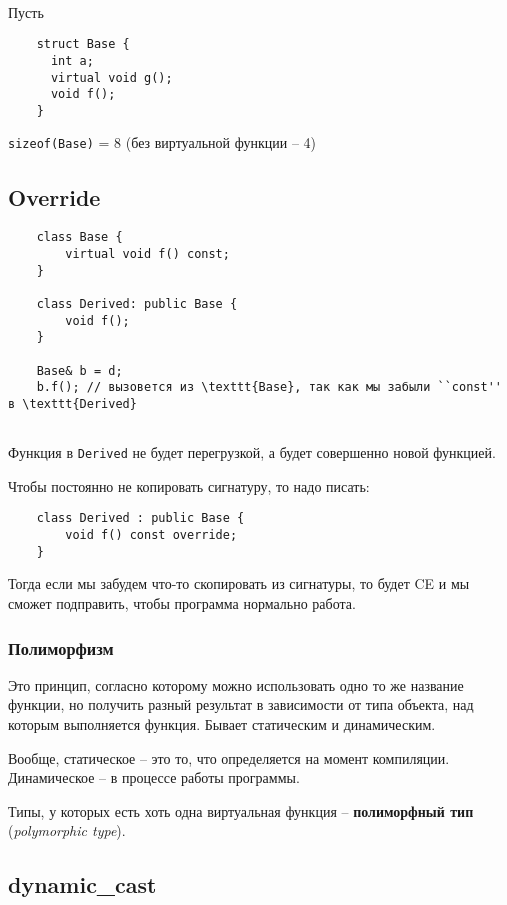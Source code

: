 \documentclass[12pt]{article}
\begin{document}
\

Пусть

\begin{lstlisting}
	struct Base {
	  int a;
	  virtual void g();
	  void f();
	}
\end{lstlisting}

\texttt{sizeof(Base)} = 8 (без виртуальной функции -- 4)

\subsection{Override}

\begin{lstlisting}
	class Base {
		virtual void f() const;
	}
	
	class Derived: public Base {
		void f();
	}
	
	Base& b = d;
	b.f(); // вызовется из \texttt{Base}, так как мы забыли ``const'' в \texttt{Derived}
	
\end{lstlisting}

Функция в \texttt{Derived} не будет перегрузкой, а будет совершенно новой функцией. 

Чтобы постоянно не копировать сигнатуру, то надо писать:

\begin{lstlisting}
	class Derived : public Base {
		void f() const override;
	}
\end{lstlisting}

Тогда если мы забудем что-то скопировать из сигнатуры, то будет CE и мы сможет подправить, чтобы программа нормально работа. 

\subsubsection{Полиморфизм}

Это принцип, согласно которому можно использовать одно то же название функции, но получить разный результат в зависимости от типа объекта, над которым выполняется функция. Бывает статическим и динамическим. 

Вообще, статическое -- это то, что определяется на момент компиляции. Динамическое -- в процессе работы программы. 

Типы, у которых есть хоть одна виртуальная функция -- \textbf{полиморфный тип} (\textit{polymorphic type}).

\subsection{dynamic\_cast} 
\end{document}
